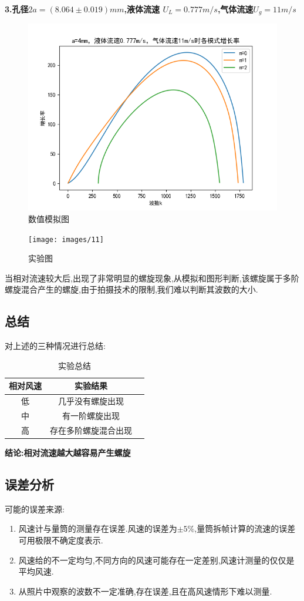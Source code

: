 \documentclass[UTF8]{gapd}
\begin{document}
\textbf{3.孔径$2a=(8.064 \pm 0.019)mm$,液体流速 $U_{L}=0.777m/s$,气体流速$U_{g}=11m/s$                  }
\begin{figure}[H]
	\centering
	\includegraphics[width=0.8\linewidth]{images/Figure_4}
	\caption{数值模拟图}
	\label{fig:P24}
\end{figure}
\begin{figure}[H]
	\centering
	\texttt{[image: images/11]}
	\caption{实验图}
	\label{fig:P25}
\end{figure}    

当相对流速较大后,出现了非常明显的螺旋现象,从模拟和图形判断,该螺旋属于多阶螺旋混合产生的螺旋,由于拍摄技术的限制,我们难以判断其波数的大小.

\subsection{总结}
对上述的三种情况进行总结:
\begin{table}[H]
\begin{tabular}{ccc}
	\toprule[1pt]
	相对风速&实验结果	\\ 
	\midrule[0.5pt]
	低&几乎没有螺旋出现\\
	中&有一阶螺旋出现\\
	高&存在多阶螺旋混合出现\\
	\bottomrule[1pt]
\end{tabular}
\caption{实验总结}
\end{table}

\textbf{结论:相对流速越大越容易产生螺旋}
\subsection{误差分析}

可能的误差来源:
\begin{enumerate}
	\item 风速计与量筒的测量存在误差.风速的误差为$	\pm 5\%	$,量筒拆帧计算的流速的误差可用极限不确定度表示.
	\item 风速给的不一定均匀,不同方向的风速可能存在一定差别,风速计测量的仅仅是平均风速.
	\item 从照片中观察的波数不一定准确,存在误差,且在高风速情形下难以测量.
\end{enumerate}
\end{document}
